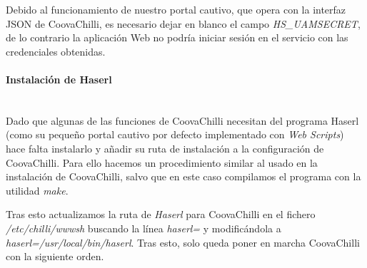 
Debido al funcionamiento de nuestro portal cautivo, que opera con la interfaz JSON de CoovaChilli, es necesario dejar en blanco el campo \emph{HS\_UAMSECRET}, de lo contrario la aplicación Web no podría iniciar sesión en el servicio con las credenciales obtenidas.

\paragraph{Instalación de Haserl} \label{HaserlInstallTitle} ~\\

Dado que algunas de las funciones de CoovaChilli necesitan del programa Haserl (como su pequeño portal cautivo por defecto implementado con \emph{Web Scripts}) hace falta instalarlo y añadir su ruta de instalación a la configuración de CoovaChilli. Para ello hacemos un procedimiento similar al usado en la instalación de CoovaChilli, salvo que en este caso compilamos el programa con la utilidad \emph{make}.


Tras esto actualizamos la ruta de \emph{Haserl} para CoovaChilli en el fichero \emph{/etc/chilli/wwwsh} buscando la línea \emph{haserl=} y modificándola a \emph{haserl=/usr/local/bin/haserl}. Tras esto, solo queda poner en marcha CoovaChilli con la siguiente orden.

